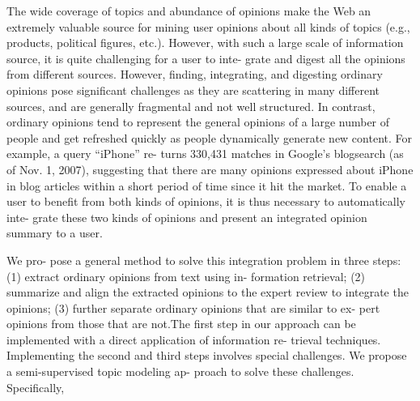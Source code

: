 \documentclass[runningheads,a4paper]{llncs}
\begin{document}
The wide coverage of topics and abundance of opinions make the Web an extremely valuable source for mining user opinions about all kinds of topics (e.g., products, political figures, etc.). However, with such a large scale of information source, it is quite challenging for a user to inte- grate and digest all the opinions from different sources. However, finding, integrating, and digesting ordinary opinions pose significant challenges as they are scattering in many different sources, and are generally fragmental and not well structured. In contrast, ordinary opinions tend to represent the general opinions of a large number of people and get refreshed quickly as people dynamically generate new content. For example, a query “iPhone” re- turns 330,431 matches in Google’s blogsearch (as of Nov. 1, 2007), suggesting that there are many opinions expressed about iPhone in blog articles within a short period of time since it hit the market. To enable a user to benefit from both kinds of opinions, it is thus necessary to automatically inte- grate these two kinds of opinions and present an integrated opinion summary to a user. \cite{lu2008opinion}

We pro- pose a general method to solve this integration problem in three steps: (1) extract ordinary opinions from text using in- formation retrieval; (2) summarize and align the extracted opinions to the expert review to integrate the opinions; (3) further separate ordinary opinions that are similar to ex- pert opinions from those that are not.The first step in our approach can be implemented with a direct application of information re- trieval techniques. Implementing the second and third steps involves special challenges. We propose a semi-supervised topic modeling ap- proach to solve these challenges. Specifically,
\end{document}
